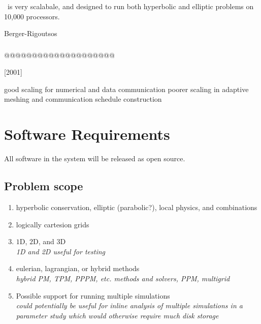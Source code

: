 \documentclass{article}
\begin{document}
\chombo\ is very scalabale, and designed to run both hyperbolic and
elliptic problems on 10,000 processors.

Berger-Rigoutsos 



\subsubsection{} \label{sss:samrai}

@@@@@@@@@@@@@@@@@@@@

[2001]

good scaling for numerical and data communication
poorer scaling in adaptive meshing and communication schedule construction 

\subsubsection{\gadget } \label{sss:chombo}


\newpage
\section{Software Requirements} \label{s:requirements}


All software in the system will be released as open source.

\subsection{Problem scope}

\begin{enumerate}
    \item hyperbolic conservation, elliptic (parabolic?), local physics, and combinations
    \item logically cartesion grids
    \item $1$D, $2$D, and $3$D
      \\ \textit{1D and 2D useful for testing}
    \item eulerian, lagrangian, or hybrid methods
      \\ \textit{hybrid PM, TPM, PPPM, etc. methods and solvers, PPM, multigrid }
    \item Possible support for running multiple simulations
      \\ \textit{could potentially be useful for inline analysis of multiple simulations in a parameter study which would otherwise require much disk storage }
\end{enumerate}
\end{document}
